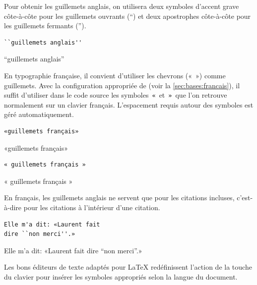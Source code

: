 {Pour obtenir les guillemets anglais, on utilisera deux symboles
d'accent grave côte-à-côte pour les guillemets ouvrants (``) et deux
apostrophes côte-à-côte pour les guillemets fermants ('').
\begin{demo}
  \begin{texample}
\begin{lstlisting}[escapeinside={}]
``guillemets anglais''
\end{lstlisting}
    \producing
    ``guillemets anglais''
  \end{texample}
\end{demo}

En typographie française, il convient d'utiliser les chevrons («\ »)
comme guillemets. Avec la configuration appropriée de 
(voir la \autoref{sec:bases:francais}), il suffit d'utiliser dans le
code source les symboles \,\verb=«=\, et \,\verb=»=\, que l'on
retrouve normalement sur un clavier français. L'espacement requis
autour des symboles est géré automatiquement.
\begin{demo}
  \begin{texample}
\begin{lstlisting}
«guillemets français»
\end{lstlisting}
    \producing
    «guillemets français»
  \end{texample}
  \begin{texample}
\begin{lstlisting}
« guillemets français »
\end{lstlisting}
    \producing
    « guillemets français »
  \end{texample}
\end{demo}
En français, les guillemets anglais ne servent que pour les citations
incluses, c'est-à-dire pour les citations à l'intérieur d'une
citation.
\begin{demo}
  \begin{texample}
\begin{lstlisting}[escapeinside={}]
Elle m'a dit: «Laurent fait
dire ``non merci''.»
\end{lstlisting}
    \producing
    Elle m'a dit: «Laurent fait
    dire ``non merci''.»
  \end{texample}
\end{demo}

Les bons éditeurs de texte adaptés pour {\LaTeX} redéfinissent
l'action de la touche %
\raisebox{-2pt}{%
  \ooalign{\hfil\Large\faSquareO\hfil\cr\hfil\ttfamily\textquotedbl\hfil}} %
du clavier pour insérer les symboles appropriés selon la langue du
document.

}
